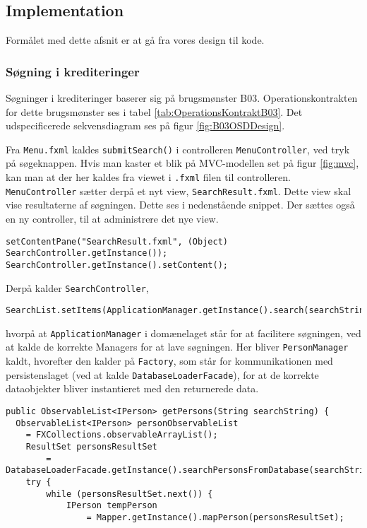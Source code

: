\subsection{Implementation}

Formålet med dette afsnit er at gå fra vores design til kode.

\subsubsection{Søgning i krediteringer}%
\label{ssub:sogning_i_krediteringer}

Søgninger i krediteringer baserer sig på brugsmønster B03. Operationskontrakten
for dette brugsmønster ses i tabel \ref{tab:OperationsKontraktB03}. Det
udspecificerede sekvensdiagram ses på figur \ref{fig:B03OSDDesign}.

Fra \texttt{Menu.fxml} kaldes \texttt{submitSearch()} i controlleren
\texttt{MenuController}, ved tryk på søgeknappen. Hvis man kaster et blik på
MVC-modellen set på figur \ref{fig:mvc}, kan man at der her kaldes fra viewet i
\texttt{.fxml} filen til controlleren. \texttt{MenuController} sætter derpå et
nyt view, \texttt{SearchResult.fxml}. Dette view skal vise resultaterne af
søgningen. Dette ses i nedenstående snippet. Der sættes også en ny controller,
til at administrere det nye view.

\begin{lstlisting}
setContentPane("SearchResult.fxml", (Object) SearchController.getInstance());
SearchController.getInstance().setContent();
\end{lstlisting}

Derpå kalder \texttt{SearchController},

\begin{lstlisting}
SearchList.setItems(ApplicationManager.getInstance().search(searchString));
\end{lstlisting}

hvorpå at \texttt{ApplicationManager} i domænelaget står for at facilitere
søgningen, ved at kalde de korrekte Managers for at lave søgningen. Her bliver
\texttt{PersonManager} kaldt, hvorefter den kalder på \texttt{Factory}, som står
for kommunikationen med persistenslaget (ved at kalde
\texttt{DatabaseLoaderFacade}), for at de korrekte dataobjekter bliver
instantieret med den returnerede data. 

\begin{lstlisting}[basicstyle=\ttfamily\footnotesize, firstnumber=31,
label=lis:factory, caption=Forspørgsel til
persistenslaget og konstruktion af dataobjekter (\texttt{Factory.java})]
public ObservableList<IPerson> getPersons(String searchString) {
  ObservableList<IPerson> personObservableList 
    = FXCollections.observableArrayList();
    ResultSet personsResultSet 
        = DatabaseLoaderFacade.getInstance().searchPersonsFromDatabase(searchString);
    try {
        while (personsResultSet.next()) {
            IPerson tempPerson 
                = Mapper.getInstance().mapPerson(personsResultSet);
\end{lstlisting}


